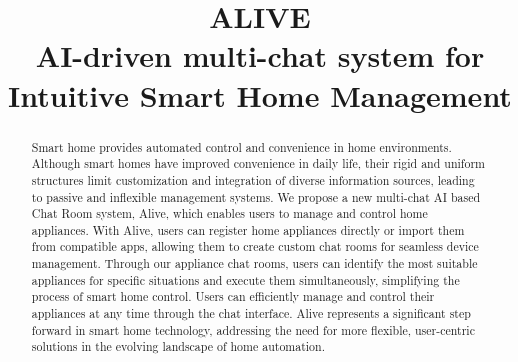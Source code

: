 \documentclass[conference]{IEEEtran}
\begin{document}
    
\title{ALIVE\\{\large
 AI-driven multi-chat system for Intuitive Smart Home Management
 }
}

\author{

\and


\and


\and

}

\maketitle


\begin{abstract}
Smart home provides automated control and convenience in home environments. Although smart homes have improved convenience in daily life, their rigid and uniform structures limit customization and integration of diverse information sources, leading to passive and inflexible management systems. We propose a new multi-chat AI based Chat Room system, Alive, which enables users to manage and control home appliances. With Alive, users can register home appliances directly or import them from compatible apps, allowing them to create custom chat rooms for seamless device management. Through our appliance chat rooms, users can identify the most suitable appliances for specific situations and execute them simultaneously, simplifying the process of smart home control. Users can efficiently manage and control their appliances at any time through the chat interface. Alive represents a significant step forward in smart home technology, addressing the need for more flexible, user-centric solutions in the evolving landscape of home automation.
\end{abstract}
\end{document}
